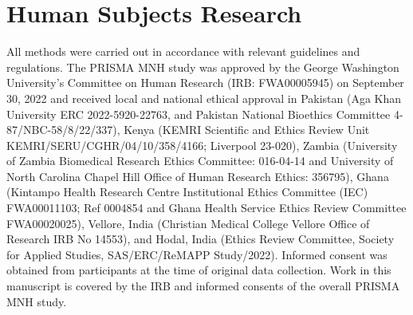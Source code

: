 \documentclass[fleqn,10pt]{wlscirep}
\begin{document}
\section*{Human Subjects Research}
All methods were carried out in accordance with relevant guidelines and regulations. The PRISMA MNH study was approved by the George Washington University’s Committee on Human Research (IRB: FWA00005945) on September 30, 2022 and received local and national ethical approval in Pakistan (Aga Khan University ERC 2022-5920-22763, and Pakistan National Bioethics Committee 4-87/NBC-58/8/22/337), Kenya (KEMRI Scientific and Ethics Review Unit KEMRI/SERU/CGHR/04/10/358/4166; Liverpool 23-020), Zambia (University of Zambia Biomedical Research Ethics Committee: 016-04-14 and University of North Carolina Chapel Hill Office of Human Research Ethics: 356795), Ghana (Kintampo Health Research Centre Institutional Ethics Committee (IEC) FWA00011103; Ref 0004854 and Ghana Health Service Ethics Review Committee FWA00020025), Vellore, India (Christian Medical College Vellore Office of Research IRB No 14553), and Hodal, India (Ethics Review Committee, Society for Applied Studies, SAS/ERC/ReMAPP Study/2022). Informed consent was obtained from participants at the time of original data collection. Work in this manuscript is covered by the IRB and informed consents of the overall PRISMA MNH study.
\end{document}
